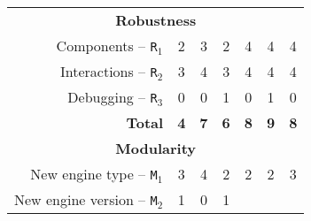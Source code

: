 \documentclass[preprint,3p,twocolumn]{elsarticle}
\begin{document}
\begin{table*}
\begin{tabular}{rcccccc}
\multicolumn{7}{c}{\cellcolor[HTML]{EEEEEE}\textbf{Robustness}}\\
Components  --   \texttt{R$_1$}      & \cellcolor[HTML]{99FF99}2
                                     & \cellcolor[HTML]{99DD99}3
                                     & \cellcolor[HTML]{99FF99}2
                                     & \cellcolor[HTML]{99AA99}4  
                                     & \cellcolor[HTML]{99AA99}4 
                                     & \cellcolor[HTML]{99AA99}4 \\
Interactions -- \texttt{R$_2$}       & \cellcolor[HTML]{99FF99}3    
                                     & \cellcolor[HTML]{99DD99}4
                                     & \cellcolor[HTML]{99DD99}3      
                                     & \cellcolor[HTML]{99AA99}4  
                                     & \cellcolor[HTML]{99AA99}4      
                                     & \cellcolor[HTML]{99AA99}4 \\
Debugging --    \texttt{R$_3$}       & \cellcolor[HTML]{99AA99}0          
                                     & \cellcolor[HTML]{99FF99}0
                                     & \cellcolor[HTML]{99AA99}1
                                     & \cellcolor[HTML]{99FF99}0
                                     & \cellcolor[HTML]{99AA99}1
                                     & \cellcolor[HTML]{99FF99}0 \\
\textbf{Total}                       & \cellcolor[HTML]{99FF99}\textbf{4}
                                     & \cellcolor[HTML]{99CC99}\textbf{7}
                                     & \cellcolor[HTML]{99CC99}\textbf{6}
                                     & \cellcolor[HTML]{99BB99}\textbf{8}
                                     & \cellcolor[HTML]{99AA99}\textbf{9}
                                     & \cellcolor[HTML]{99BB99}\textbf{8} \\
\multicolumn{7}{c}{\cellcolor[HTML]{EEEEEE}\textbf{Modularity}}\\
New engine type -- \texttt{M$_1$}    & \cellcolor[HTML]{99AA99}3
                                     & \cellcolor[HTML]{99DD99}4
                                     & \cellcolor[HTML]{99FF99}2
                                     & \cellcolor[HTML]{99DD99}2
                                     & \cellcolor[HTML]{99DD99}2
                                     & \cellcolor[HTML]{99AA99}3 \\
New engine version -- \texttt{M$_2$} & \cellcolor[HTML]{99AA99}1
                                     & \cellcolor[HTML]{99FF99}0
                                     & \cellcolor[HTML]{99FF99}1

\end{tabular}
\end{table*}
\end{document}
